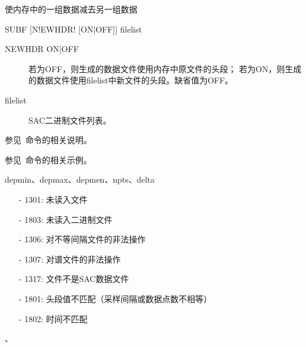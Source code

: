\label{cmd:subf}

使内存中的一组数据减去另一组数据

\begin{SACSTX}
SUBF [N!EWHDR! [ON|OFF]] filelist
\end{SACSTX}

\begin{description}
\item [NEWHDR ON|OFF] 若为OFF，则生成的数据文件使用内存中原文件的头段；          
    若为ON，则生成的数据文件使用filelist中新文件的头段。缺省值为OFF。
\item [filelist] SAC二进制文件列表。
\end{description}

参见~命令的相关说明。

参见~命令的相关示例。

depmin、depmax、depmen、npts、delta

\begin{itemize}
\item[-]1301: 未读入文件
\item[-]1803: 未读入二进制文件
\item[-]1306: 对不等间隔文件的非法操作
\item[-]1307: 对谱文件的非法操作
\item[-]1317: 文件不是SAC数据文件
\item[-]1801: 头段值不匹配（采样间隔或数据点数不相等）
\end{itemize}

\begin{itemize}
\item[-]1802: 时间不匹配
\end{itemize}

、
